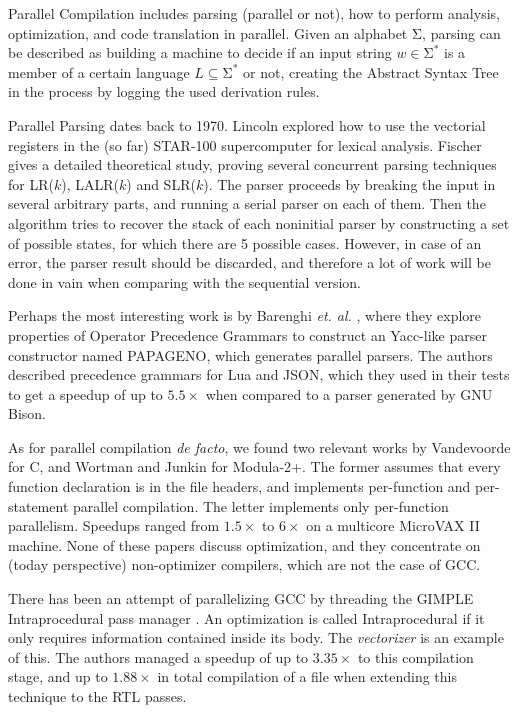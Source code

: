 \documentclass[runningheads]{llncs}
\begin{document}
Parallel Compilation includes parsing (parallel or not),
how to perform analysis, optimization, and code translation in parallel.
Given an alphabet $\mathrm{\Sigma}$, parsing can be described as building a machine to decide if
an input string $w \in \mathrm{\Sigma}^*$ is a member of a certain language $L
\subseteq \mathrm{\Sigma}^*$ or not, creating the Abstract Syntax Tree in the
process by logging the used derivation rules.

Parallel Parsing dates back to 1970. Lincoln \cite{Lincoln:1970:PPT:987475.987478}
explored how to use the vectorial registers in the (so far)
STAR-100 supercomputer for lexical analysis. Fischer
\cite{fischer1975parsing} gives a detailed theoretical study, proving
several concurrent parsing techniques for LR($k$), LALR($k$) and SLR($k$).
The parser proceeds by breaking the input in several arbitrary parts, and running a
serial parser on each of them. Then the algorithm tries to
recover the stack of each noninitial parser by constructing a set of
possible states, for which there are 5 possible cases. However, in case
of an error, the parser result should be discarded, and therefore a lot
of work will be done in vain when comparing with the sequential version.

Perhaps the most interesting work is by Barenghi \textit{et. al.}
\cite{Barenghi:2015:PPM:2839536.2840146}, where they explore properties of
Operator Precedence Grammars to construct an Yacc-like parser constructor named
PAPAGENO, which generates parallel parsers. The authors described
precedence grammars for Lua and JSON, which they used in their tests to get
a speedup of up to $5.5\times$ when compared to a parser generated by
GNU Bison.

As for parallel compilation \textit{de facto}, we found two relevant works by
Vandevoorde \cite{vandevoorde1988parallel} for C, and Wortman and Junkin
\cite{wortman1992} for Modula-2+.  The former assumes that every function
declaration is in the file headers, and implements per-function and
per-statement parallel compilation. The letter implements only per-function
parallelism.  Speedups ranged from $1.5\times$ to $6\times$ on a multicore
MicroVAX II machine. None of these papers discuss optimization, and they
concentrate on (today perspective) non-optimizer compilers, which are not
the case of GCC. 

There has been an attempt of parallelizing GCC by threading the GIMPLE
Intraprocedural pass manager \cite{bernardino2020improving}. An optimization is
called Intraprocedural if it only requires information contained inside its body.
The \textit{vectorizer} is an example of this. The authors managed a speedup of up to
$3.35\times$ to this compilation stage, and up to $1.88\times$ in
total compilation of a file when extending this technique to the RTL passes.
\end{document}
